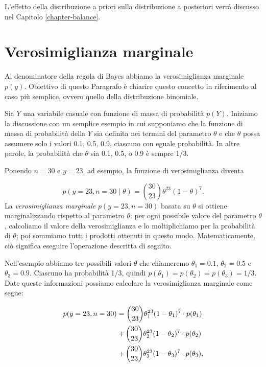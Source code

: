 \documentclass[
]{memoir}
\theoremstyle{definition}
\theoremstyle{definition}
\theoremstyle{definition}
\theoremstyle{definition}
\theoremstyle{remark}
\begin{document}
L'effetto della distribuzione a priori sulla distribuzione a posteriori verrà discusso nel Capitolo \ref{chapter-balance}.

\hypertarget{verosim-marginale}{%
\section{Verosimiglianza marginale}\label{verosim-marginale}}

Al denominatore della regola di Bayes abbiamo la verosimiglianza marginale \(p(y)\). Obiettivo di questo Paragrafo è chiarire questo concetto in riferimento al caso più semplice, ovvero quello della distribuzione binomiale.

Sia \(Y\) una variabile casuale con funzione di massa di probabilità \(p(Y)\). Iniziamo la discussione con un semplice esempio in cui supponiamo che la funzione di massa di probabilità della \(Y\) sia definita nei termini del parametro \(\theta\) e che \(\theta\) possa assumere solo i valori 0.1, 0.5, 0.9, ciascuno con eguale probabilità. In altre parole, la probabilità che \(\theta\) sia 0.1, 0.5, o 0.9 è sempre 1/3.

Ponendo \(n = 30\) e \(y = 23\), ad esempio, la funzione di verosimiglianza diventa

\[
p(y = 23, n = 30 \mid \theta) = \binom{30}{23} \theta^{23} (1-\theta)^{7}.
\]
La \emph{verosimiglianza marginale} \(p(y = 23, n = 30)\) basata su \(\theta\) si ottiene marginalizzando rispetto al parametro \(\theta\): per ogni possibile valore del parametro \(\theta\), calcoliamo il valore della verosimiglianza e lo moltiplichiamo per la probabilità di \(\theta\); poi sommiamo tutti i prodotti ottenuti in questo modo. Matematicamente, ciò significa eseguire l'operazione descritta di seguito.

Nell'esempio abbiamo tre possibili valori \(\theta\) che chiameremo \(\theta_1 = 0.1\), \(\theta_2 = 0.5\) e \(\theta_3 = 0.9\). Ciascuno ha probabilità 1/3, quindi \(p(\theta_1) = p(\theta_2) = p(\theta_3) = 1/3\). Date queste informazioni possiamo calcolare la verosimiglianza marginale come segue:

\begin{align}
p(y = 23, n = 30) &= \binom{30}{23} \theta_1^{23} (1-\theta_1)^{7} \cdot p(\theta_1) \notag\\
&+ \binom{30}{23} \theta_2^{23} (1-\theta_2)^{7} \cdot p(\theta_2) \notag\\
&+ \binom{30}{23} \theta_3^{23} (1-\theta_3)^{7} \cdot p(\theta_3) \notag,
\end{align}
\end{document}

